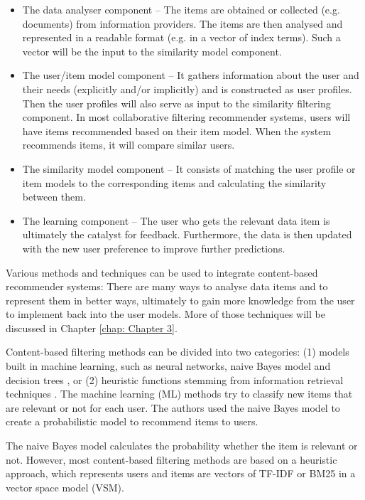 \begin{itemize}
    \item The data analyser component – The items are obtained or collected (e.g. documents) from information providers. The items are then analysed and represented in a readable format (e.g. in a vector of index terms).
    Such a vector will be the input to the similarity model component.
    \item The user/item model component – It gathers information about the user and their needs (explicitly and/or implicitly) and is constructed as user profiles. Then the user profiles will also serve as input to the similarity filtering component. In most collaborative filtering recommender systems, users will have items recommended based on their item model.
    When the system recommends items, it will compare similar users.
    \item The similarity model component – It consists of matching the user profile or item models to the corresponding items and calculating the similarity between them.
    \item The learning component – The user who gets the relevant data item is ultimately the catalyst for feedback. Furthermore, the data is then updated with the new user preference to improve further predictions.
\end{itemize}

Various methods and techniques can be used to integrate content-based recommender systems: There are many ways to analyse data items and to represent them in better ways, ultimately to gain more knowledge from the user to implement back into  the user models. More of those techniques will be discussed in Chapter \ref{chap: Chapter 3}.

Content-based filtering methods can be divided into two categories: (1) models built in machine learning, such as neural networks, naive Bayes model and decision trees \cite{lops2011content}, or (2) heuristic functions stemming from information retrieval techniques \cite{cantador2010content,diederich2006finding}. The machine learning (ML) methods try to classify new items that are relevant or not for each user. The authors \cite{lops2011content} used the naive Bayes model to create a probabilistic model to recommend items to users.

The naive Bayes model calculates the probability whether the item is relevant or not. However, most content-based filtering methods are based on a heuristic approach, which represents users and items are vectors of TF-IDF \cite{jones2004statistical} or BM25 \cite{baeza1999modern} in a vector space model (VSM).

